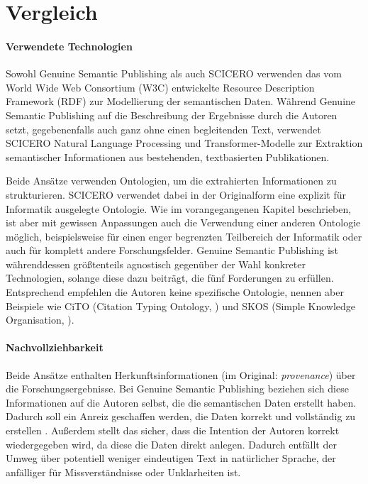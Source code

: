 \section{Vergleich}
\label{sec:vergleich}


\paragraph{Verwendete Technologien}

Sowohl Genuine Semantic Publishing als auch SCICERO verwenden das vom World Wide Web Consortium (W3C) entwickelte Resource Description Framework (RDF) zur Modellierung der semantischen Daten.
Während Genuine Semantic Publishing auf die Beschreibung der Ergebnisse durch die Autoren setzt, gegebenenfalls auch ganz ohne einen begleitenden Text, verwendet SCICERO Natural Language Processing und Transformer-Modelle zur Extraktion semantischer Informationen aus bestehenden, textbasierten Publikationen.

Beide Ansätze verwenden Ontologien, um die extrahierten Informationen zu strukturieren.
SCICERO verwendet dabei in der Originalform eine explizit für Informatik ausgelegte Ontologie.
Wie im vorangegangenen Kapitel beschrieben, ist aber mit gewissen Anpassungen auch die Verwendung einer anderen Ontologie möglich, beispielsweise für einen enger begrenzten Teilbereich der Informatik oder auch für komplett andere Forschungsfelder.
Genuine Semantic Publishing ist währenddessen größtenteils agnostisch gegenüber der Wahl konkreter Technologien, solange diese dazu beiträgt, die fünf Forderungen zu erfüllen.
Entsprechend empfehlen die Autoren keine spezifische Ontologie, nennen aber Beispiele wie CiTO (Citation Typing Ontology, \cite{cito}) und SKOS (Simple Knowledge Organisation, \cite{skos}).

\paragraph{Nachvollziehbarkeit}

Beide Ansätze enthalten Herkunftsinformationen (im Original: \textit{provenance}) über die Forschungsergebnisse.
Bei Genuine Semantic Publishing beziehen sich diese Informationen auf die Autoren selbst, die die semantischen Daten erstellt haben.
Dadurch soll ein Anreiz geschaffen werden, die Daten korrekt und vollständig zu erstellen \cite{kuhn2017genuine}.
Außerdem stellt das sicher, dass die Intention der Autoren korrekt wiedergegeben wird, da diese die Daten direkt anlegen.
Dadurch entfällt der Umweg über potentiell weniger eindeutigen Text in natürlicher Sprache, der anfälliger für Missverständnisse oder Unklarheiten ist.


